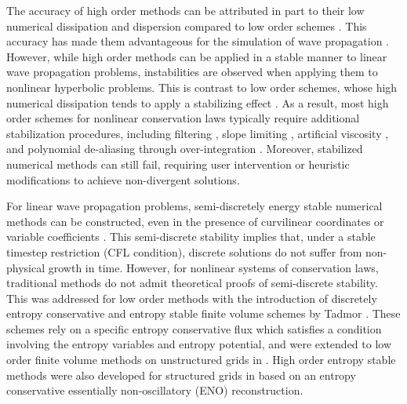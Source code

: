 \documentclass[preprint,10pt]{elsarticle}
\theoremstyle{definition}
\theoremstyle{lemma}
\theoremstyle{theorem}
\theoremstyle{assumption}
\begin{document}
The accuracy of high order methods can be attributed in part to their low numerical dissipation and dispersion compared to low order schemes \cite{ainsworth2004dispersive}.  This accuracy has made them advantageous for the simulation of wave propagation \cite{hesthaven2007nodal, wilcox2010high}.  However, while high order methods can be applied in a stable manner to linear wave propagation problems, instabilities are observed when applying them to nonlinear hyperbolic problems.  This is contrast to low order schemes, whose high numerical dissipation tends to apply a stabilizing effect \cite{wang2013high}.  As a result, most high order schemes for nonlinear conservation laws typically require additional stabilization procedures, including  filtering \cite{hesthaven2007nodal}, slope limiting \cite{krivodonova2007limiters}, artificial viscosity \cite{persson2006sub}, and polynomial de-aliasing through over-integration \cite{kirby2003aliasing}.  Moreover, stabilized numerical methods can still fail, requiring user intervention or heuristic modifications to achieve non-divergent solutions.  

For linear wave propagation problems, semi-discretely energy stable numerical methods can be constructed, even in the presence of curvilinear coordinates or variable coefficients \cite{warburton2013low, chan2016weight1, chan2016weight2, chan2017weight}.  This semi-discrete stability implies that, under a stable timestep restriction (CFL condition), discrete solutions do not suffer from non-physical growth in time.  However, for nonlinear systems of conservation laws, traditional methods do not admit theoretical proofs of semi-discrete stability.  This was addressed for low order methods with the introduction of discretely entropy conservative and entropy stable finite volume schemes by Tadmor \cite{tadmor1987numerical}.   These schemes rely on a specific entropy conservative flux which satisfies a condition involving the entropy variables and entropy potential, and were extended to low order finite volume methods on unstructured grids in \cite{ray2016entropy}.  High order entropy stable methods were also developed for structured grids in \cite{fjordholm2012arbitrarily} based on an entropy conservative essentially non-oscillatory (ENO) reconstruction.  
\end{document}
